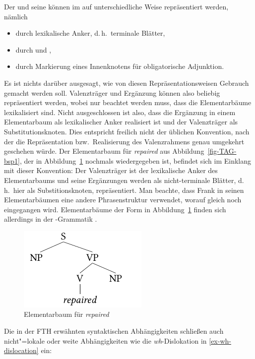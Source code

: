 Der  und seine  können im  auf unterschiedliche Weise repräsentiert werden, nämlich 
\begin{itemize}
  \item durch lexikalische Anker, d.\,h.\ terminale Blätter,
  \item durch  und ,
  \item durch Markierung eines Innenknotens für obligatorische Adjunktion.
\end{itemize}
Es ist nichts darüber ausgesagt, wie von diesen Repräsentationsweisen Gebrauch gemacht werden soll. Valenzträger und Ergänzung können also beliebig repräsentiert werden, wobei nur beachtet werden muss, dass die Elementarbäume lexikalisiert sind. Nicht ausgeschlossen ist also, dass die Ergänzung in einem Elementarbaum als lexikalischer Anker realisiert ist und der Valenzträger als Substitutionsknoten. Dies entspricht freilich nicht der üblichen Konvention, nach der die Repräsentation bzw.\ Realisierung des Valenzrahmens genau umgekehrt geschehen würde. Der Elementarbaum für {\it repaired} aus Abbildung~\ref{fig-TAG-bsp1}, der in Abbildung~\ref{fig-TAG-bsp1-1} nochmals wiedergegeben ist, befindet sich im Einklang mit dieser Konvention: Der Valenzträger ist der lexikalische Anker des Elementarbaums und seine Ergänzungen werden als nicht-terminale Blätter, d.\,h.\ hier als Substitionsknoten, repräsentiert. Man beachte, dass Frank in seinen Elementarbäumen eine andere Phrasenstruktur verwendet, worauf gleich noch eingegangen wird. Elementarbäume der Form in Abbildung~\ref{fig-TAG-bsp1-1} finden sich allerdings in der -Grammatik \citep{xtag:01}. 
\begin{figure}[t]
\centering
\includegraphics{graphics/abb56.pdf}
\caption{\label{fig-TAG-bsp1-1}Elementarbaum für {\it repaired}}
\end{figure}

    
Die in der FTH erwähnten syntaktischen Abhängigkeiten schlie\ss en auch nicht"=lokale oder weite Abhängigkeiten wie die \textit{wh}-Dislokation in \ref{ex-wh-dislocation} ein:

